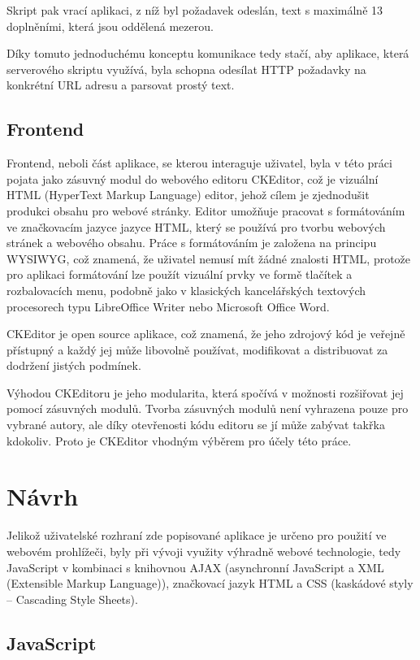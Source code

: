 \documentclass[a4paper,11pt]{article}
\begin{document}
Skript pak vrací aplikaci, z níž byl požadavek odeslán, text s maximálně 13 doplněními, která jsou oddělená mezerou.

Díky tomuto jednoduchému konceptu komunikace tedy stačí, aby aplikace, která serverového skriptu využívá, byla schopna odesílat HTTP požadavky na konkrétní URL adresu a parsovat prostý text. 

\subsection{Frontend}

Frontend, neboli část aplikace, se kterou interaguje uživatel, byla v této práci pojata jako zásuvný modul do webového editoru CKEditor, což je vizuální HTML (HyperText Markup Language) editor, jehož cílem je zjednodušit produkci obsahu pro webové stránky. Editor umožňuje pracovat s formátováním ve značkovacím jazyce jazyce HTML, který se používá pro tvorbu webových stránek a webového obsahu. Práce s formátováním je založena na principu WYSIWYG, což znamená, že uživatel nemusí mít žádné znalosti HTML, protože pro aplikaci formátování lze použít vizuální prvky ve formě tlačítek a rozbalovacích menu, podobně jako v klasických kancelářských textových procesorech typu LibreOffice Writer nebo Microsoft Office Word.

CKEditor je open source aplikace, což znamená, že jeho zdrojový kód je veřejně přístupný a každý jej může libovolně používat, modifikovat a distribuovat za dodržení jistých podmínek. 

Výhodou CKEditoru je jeho modularita, která spočívá v možnosti rozšiřovat jej pomocí zásuvných modulů. Tvorba zásuvných modulů není vyhrazena pouze pro vybrané autory, ale  díky otevřenosti kódu editoru se jí může zabývat takřka kdokoliv. Proto je CKEditor vhodným výběrem pro účely této práce. %

\section{Návrh}\label{navrh}

Jelikož uživatelské rozhraní zde popisované aplikace je určeno pro použití ve webovém prohlížeči, byly při vývoji využity výhradně webové technologie, tedy JavaScript v kombinaci s knihovnou AJAX (asynchronní JavaScript a XML (Extensible Markup Language)), značkovací jazyk HTML a CSS (kaskádové styly -- Cascading Style Sheets). 

\subsection{JavaScript}
\end{document}
